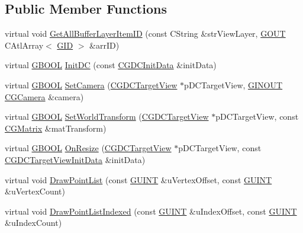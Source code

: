 \subsection*{Public Member Functions}
\begin{DoxyCompactItemize}
\item 
virtual void \hyperlink{class_c_g_d_c_direct_x11_a6c4c2a6a8382ac2e02ffd24d07e474b0}{Get\+All\+Buffer\+Layer\+Item\+I\+D} (const C\+String \&str\+View\+Layer, \hyperlink{_g_types_8h_a0858ec221262e635612871d70ca233ad}{G\+O\+U\+T} C\+Atl\+Array$<$ \hyperlink{_g_types_8h_a5b96ecb16d8e437977d12cd40aa6f6d8}{G\+I\+D} $>$ \&arr\+I\+D)
\item 
virtual \hyperlink{_g_types_8h_a2901915743626352a6820c5405f556dc}{G\+B\+O\+O\+L} \hyperlink{class_c_g_d_c_direct_x11_a64d62748076608701a1f183d1ea79c32}{Init\+D\+C} (const \hyperlink{class_c_g_d_c_init_data}{C\+G\+D\+C\+Init\+Data} \&init\+Data)
\item 
virtual \hyperlink{_g_types_8h_a2901915743626352a6820c5405f556dc}{G\+B\+O\+O\+L} \hyperlink{class_c_g_d_c_direct_x11_a51bbbde51ac7926c05661cf19100ad3c}{Set\+Camera} (\hyperlink{class_c_g_d_c_target_view}{C\+G\+D\+C\+Target\+View} $\ast$p\+D\+C\+Target\+View, \hyperlink{_g_types_8h_a3fc97b512f82d8e1a710da1235f9142a}{G\+I\+N\+O\+U\+T} \hyperlink{class_c_g_camera}{C\+G\+Camera} \&camera)
\item 
virtual \hyperlink{_g_types_8h_a2901915743626352a6820c5405f556dc}{G\+B\+O\+O\+L} \hyperlink{class_c_g_d_c_direct_x11_af04aa6feaebc83850d7dbb49ca44dd7f}{Set\+World\+Transform} (\hyperlink{class_c_g_d_c_target_view}{C\+G\+D\+C\+Target\+View} $\ast$p\+D\+C\+Target\+View, const \hyperlink{class_c_g_matrix}{C\+G\+Matrix} \&mat\+Transform)
\item 
virtual \hyperlink{_g_types_8h_a2901915743626352a6820c5405f556dc}{G\+B\+O\+O\+L} \hyperlink{class_c_g_d_c_direct_x11_a3f0dd8b3bac87e0b444d3837e132e5db}{On\+Resize} (\hyperlink{class_c_g_d_c_target_view}{C\+G\+D\+C\+Target\+View} $\ast$p\+D\+C\+Target\+View, const \hyperlink{class_c_g_d_c_target_view_init_data}{C\+G\+D\+C\+Target\+View\+Init\+Data} \&init\+Data)
\item 
virtual void \hyperlink{class_c_g_d_c_direct_x11_ac3f428e63c01642bb8bf93824753f04c}{Draw\+Point\+List} (const \hyperlink{_g_types_8h_a415305cdf38fc38f67c037973e9a748c}{G\+U\+I\+N\+T} \&u\+Vertex\+Offset, const \hyperlink{_g_types_8h_a415305cdf38fc38f67c037973e9a748c}{G\+U\+I\+N\+T} \&u\+Vertex\+Count)
\item 
virtual void \hyperlink{class_c_g_d_c_direct_x11_a82c5dc737da8c0b906e3206a5bedb965}{Draw\+Point\+List\+Indexed} (const \hyperlink{_g_types_8h_a415305cdf38fc38f67c037973e9a748c}{G\+U\+I\+N\+T} \&u\+Index\+Offset, const \hyperlink{_g_types_8h_a415305cdf38fc38f67c037973e9a748c}{G\+U\+I\+N\+T} \&u\+Index\+Count)

\end{DoxyCompactItemize}

